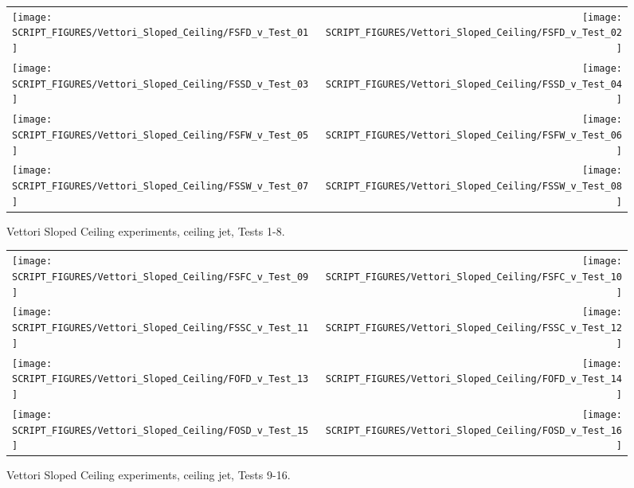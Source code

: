 \newpage

\begin{figure}[p]
\begin{tabular*}{\textwidth}{l@{\extracolsep{\fill}}r}
\texttt{[image: SCRIPT\_FIGURES/Vettori\_Sloped\_Ceiling/FSFD\_v\_Test\_01]} &
\texttt{[image: SCRIPT\_FIGURES/Vettori\_Sloped\_Ceiling/FSFD\_v\_Test\_02]} \\
\texttt{[image: SCRIPT\_FIGURES/Vettori\_Sloped\_Ceiling/FSSD\_v\_Test\_03]} &
\texttt{[image: SCRIPT\_FIGURES/Vettori\_Sloped\_Ceiling/FSSD\_v\_Test\_04]} \\
\texttt{[image: SCRIPT\_FIGURES/Vettori\_Sloped\_Ceiling/FSFW\_v\_Test\_05]} &
\texttt{[image: SCRIPT\_FIGURES/Vettori\_Sloped\_Ceiling/FSFW\_v\_Test\_06]} \\
\texttt{[image: SCRIPT\_FIGURES/Vettori\_Sloped\_Ceiling/FSSW\_v\_Test\_07]} &
\texttt{[image: SCRIPT\_FIGURES/Vettori\_Sloped\_Ceiling/FSSW\_v\_Test\_08]} \\
\end{tabular*}
\caption{Vettori Sloped Ceiling experiments, ceiling jet, Tests 1-8.}
\label{Vettori_Sloped_1}
\end{figure}

\begin{figure}[p]
\begin{tabular*}{\textwidth}{l@{\extracolsep{\fill}}r}
\texttt{[image: SCRIPT\_FIGURES/Vettori\_Sloped\_Ceiling/FSFC\_v\_Test\_09]} &
\texttt{[image: SCRIPT\_FIGURES/Vettori\_Sloped\_Ceiling/FSFC\_v\_Test\_10]} \\
\texttt{[image: SCRIPT\_FIGURES/Vettori\_Sloped\_Ceiling/FSSC\_v\_Test\_11]} &
\texttt{[image: SCRIPT\_FIGURES/Vettori\_Sloped\_Ceiling/FSSC\_v\_Test\_12]} \\
\texttt{[image: SCRIPT\_FIGURES/Vettori\_Sloped\_Ceiling/FOFD\_v\_Test\_13]} &
\texttt{[image: SCRIPT\_FIGURES/Vettori\_Sloped\_Ceiling/FOFD\_v\_Test\_14]} \\
\texttt{[image: SCRIPT\_FIGURES/Vettori\_Sloped\_Ceiling/FOSD\_v\_Test\_15]} &
\texttt{[image: SCRIPT\_FIGURES/Vettori\_Sloped\_Ceiling/FOSD\_v\_Test\_16]} \\
\end{tabular*}
\caption{Vettori Sloped Ceiling experiments, ceiling jet, Tests 9-16.}
\label{Vettori_Sloped_2}
\end{figure}

